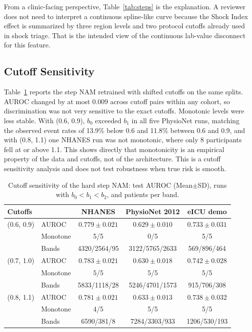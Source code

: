\documentclass[conference]{IEEEtran}
\begin{document}
From a clinic-facing perspective, Table~\ref{tab:steps} is the explanation. A reviewer does not need to interpret a continuous spline-like curve because the Shock Index effect is summarized by three region levels and two protocol cutoffs already used in shock triage. That is the intended view of the continuous lab-value disconnect for this feature.

\subsection{Cutoff Sensitivity}
Table~\ref{tab:sens} reports the step NAM retrained with shifted cutoffs on the same splits. AUROC changed by at most 0.009 across cutoff pairs within any cohort, so discrimination was not very sensitive to the exact cutoffs. Monotonic levels were less stable. With (0.6, 0.9), $b_0$ exceeded $b_1$ in all five PhysioNet runs, matching the observed event rates of 13.9\% below 0.6 and 11.8\% between 0.6 and 0.9, and with (0.8, 1.1) one NHANES run was not monotonic, where only 8 participants fell at or above 1.1. This shows directly that monotonicity is an empirical property of the data and cutoffs, not of the architecture. This is a cutoff sensitivity analysis and does not test robustness when true risk is smooth.

\begin{table}[!t]
\caption{Cutoff sensitivity of the hard step NAM: test AUROC (Mean$\pm$SD), runs with $b_0<b_1<b_2$, and patients per band.}
\begin{center}
\footnotesize\setlength{\tabcolsep}{2.5pt}
\begin{tabular}{llccc}
\toprule
\textbf{Cutoffs} & & \textbf{NHANES} & \textbf{PhysioNet 2012} & \textbf{eICU demo} \\
\midrule
(0.6, 0.9) & AUROC & $0.779\pm0.021$ & $0.629\pm0.010$ & $0.733\pm0.031$ \\
 & Monotone & 5/5 & 0/5 & 5/5 \\
 & Bands & 4320/2564/95 & 3122/5765/2633 & 569/896/464 \\
(0.7, 1.0) & AUROC & $0.783\pm0.021$ & $0.630\pm0.018$ & $0.742\pm0.028$ \\
 & Monotone & 5/5 & 5/5 & 5/5 \\
 & Bands & 5833/1118/28 & 5246/4701/1573 & 915/706/308 \\
(0.8, 1.1) & AUROC & $0.781\pm0.021$ & $0.633\pm0.013$ & $0.738\pm0.032$ \\
 & Monotone & 4/5 & 5/5 & 5/5 \\
 & Bands & 6590/381/8 & 7284/3303/933 & 1206/530/193 \\
\bottomrule
\end{tabular}
\label{tab:sens}
\end{center}
\end{table}
\end{document}
